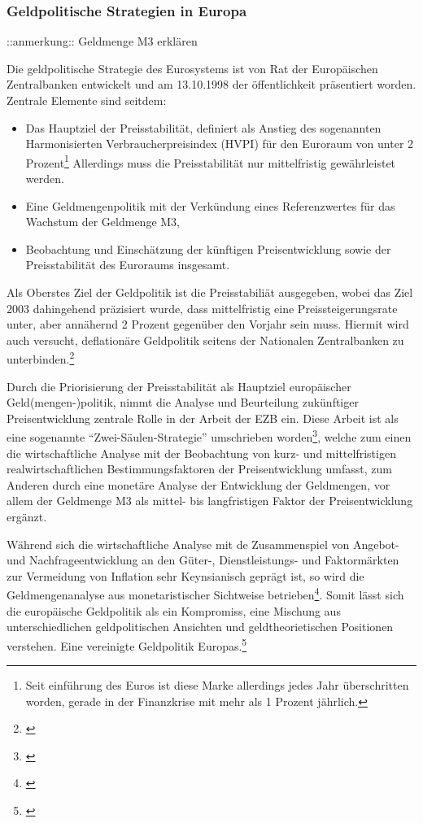 \documentclass[
    onecolumn,
    a4paper,
    abstracton,
    parskip=half
    ,final
    ]{scrartcl}
\begin{document}
\subsubsection{Geldpolitische Strategien in Europa}%
::anmerkung:: Geldmenge M3 erkl{\"a}ren

Die geldpolitische Strategie des Eurosystems ist von Rat der Europ{\"a}ischen Zentralbanken entwickelt und am 13.10.1998 der {\"o}ffentlichkeit pr{\"a}sentiert worden.
Zentrale Elemente sind seitdem:
\begin{itemize}
 \item Das Hauptziel der Preisstabilit{\"a}t, definiert als Anstieg des sogenannten Harmonisierten Verbraucherpreisindex (HVPI) f{\"u}r den Euroraum von unter 2 Prozent\footnote[78]{Seit einf{\"u}hrung des Euros ist diese Marke allerdings jedes Jahr {\"u}berschritten worden, gerade in der Finanzkrise mit mehr als 1 Prozent j{\"a}hrlich.} Allerdings muss die Preisstabilit{\"a}t nur mittelfristig gew{\"a}hrleistet werden.
 \item Eine Geldmengenpolitik mit der Verk{\"u}ndung eines Referenzwertes f{\"u}r das Wachstum der Geldmenge M3,
 \item Beobachtung und Einsch{\"a}tzung der k{\"u}nftigen Preisentwicklung sowie der Preisstabilit{\"a}t des Euroraums insgesamt.
\end{itemize}
Als Oberstes Ziel der Geldpolitik ist die Preisstabili{\"a}t ausgegeben, wobei das Ziel 2003 dahingehend pr{\"a}zisiert wurde, dass mittelfristig eine Preissteigerungsrate unter, aber ann{\"a}hernd 2 Prozent gegen{\"u}ber den Vorjahr sein muss. Hiermit wird auch versucht, deflation{\"a}re Geldpolitik seitens der Nationalen Zentralbanken zu unterbinden.\footnote[101]{\citep[vgl.][S.564-568]{Basseler2010}}

Durch die Priorisierung der Preisstabilit{\"a}t als Hauptziel europ{\"a}ischer Geld(mengen-)politik, nimmt die Analyse und Beurteilung zuk{\"u}nftiger Preisentwicklung zentrale Rolle in der Arbeit der EZB ein. Diese Arbeit ist als eine sogenannte "`Zwei-S{\"a}ulen-Strategie"' umschrieben worden\footnote[95]{\citep[S.568]{Basseler2010}}, welche zum einen die wirtschaftliche Analyse mit der Beobachtung von kurz- und mittelfristigen realwirtschaftlichen Bestimmungsfaktoren der Preisentwicklung umfasst, zum Anderen durch eine monet{\"a}re Analyse der Entwicklung der Geldmengen, vor allem der Geldmenge M3 als mittel- bis langfristigen Faktor der Preisentwicklung erg{\"a}nzt.

W{\"a}hrend sich die wirtschaftliche Analyse mit de Zusammenspiel von Angebot- und Nachfrageentwicklung an den G{\"u}ter-, Dienstleistungs- und Faktorm{\"a}rkten zur Vermeidung von Inflation sehr Keynsianisch gepr{\"a}gt ist, so wird die Geldmengenanalyse aus monetaristischer Sichtweise betrieben\footnote[97]{\citep[S.568]{Basseler2010}}. Somit l{\"a}sst sich die europ{\"a}ische Geldpolitik als ein Kompromiss, eine Mischung aus unterschiedlichen geldpolitischen Ansichten und geldtheorietischen Positionen verstehen. Eine vereinigte Geldpolitik Europas.\footnote[99]{\citep[vgl.][S.558f]{Basseler2010}}

\clearpage
\end{document}
